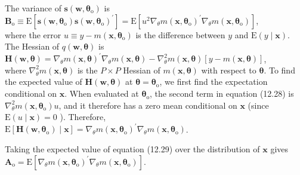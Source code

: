 \documentclass[10pt]{article}
\begin{document}
The variance of $\mathbf{s}\left(\mathbf{w}, \boldsymbol{\theta}_{\mathrm{o}}\right)$ is\\
$\mathbf{B}_{\mathrm{o}} \equiv \mathrm{E}\left[\mathbf{s}\left(\mathbf{w}, \boldsymbol{\theta}_{\mathrm{o}}\right) \mathbf{s}\left(\mathbf{w}, \boldsymbol{\theta}_{\mathrm{o}}\right)^{\prime}\right]=\mathrm{E}\left[u^{2} \nabla_{\theta} m\left(\mathbf{x}, \boldsymbol{\theta}_{\mathrm{o}}\right)^{\prime} \nabla_{\theta} m\left(\mathbf{x}, \boldsymbol{\theta}_{\mathrm{o}}\right)\right]$,\\
where the error $u \equiv y-m\left(\mathbf{x}, \boldsymbol{\theta}_{\mathrm{o}}\right)$ is the difference between $y$ and $\mathrm{E}(y \mid \mathbf{x})$.\\
The Hessian of $q(\mathbf{w}, \boldsymbol{\theta})$ is\\
$\mathbf{H}(\mathbf{w}, \boldsymbol{\theta})=\nabla_{\theta} m(\mathbf{x}, \boldsymbol{\theta})^{\prime} \nabla_{\theta} m(\mathbf{x}, \boldsymbol{\theta})-\nabla_{\theta}^{2} m(\mathbf{x}, \boldsymbol{\theta})[y-m(\mathbf{x}, \boldsymbol{\theta})]$,\\
where $\nabla_{\theta}^{2} m(\mathbf{x}, \boldsymbol{\theta})$ is the $P \times P$ Hessian of $m(\mathbf{x}, \boldsymbol{\theta})$ with respect to $\boldsymbol{\theta}$. To find the expected value of $\mathbf{H}(\mathbf{w}, \boldsymbol{\theta})$ at $\boldsymbol{\theta}=\boldsymbol{\theta}_{\mathrm{o}}$, we first find the expectation conditional on $\mathbf{x}$. When evaluated at $\boldsymbol{\theta}_{\mathrm{o}}$, the second term in equation (12.28) is $\nabla_{\theta}^{2} m\left(\mathbf{x}, \boldsymbol{\theta}_{\mathrm{o}}\right) u$, and it therefore has a zero mean conditional on $\mathbf{x}$ (since $\mathrm{E}(u \mid \mathbf{x})=0$ ). Therefore,\\
$\mathrm{E}\left[\mathbf{H}\left(\mathbf{w}, \boldsymbol{\theta}_{\mathrm{o}}\right) \mid \mathbf{x}\right]=\nabla_{\theta} m\left(\mathbf{x}, \boldsymbol{\theta}_{\mathrm{o}}\right)^{\prime} \nabla_{\theta} m\left(\mathbf{x}, \boldsymbol{\theta}_{\mathrm{o}}\right)$.

Taking the expected value of equation (12.29) over the distribution of $\mathbf{x}$ gives\\
$\mathbf{A}_{\mathrm{o}}=\mathrm{E}\left[\nabla_{\theta} m\left(\mathbf{x}, \boldsymbol{\theta}_{\mathrm{o}}\right)^{\prime} \nabla_{\theta} m\left(\mathbf{x}, \boldsymbol{\theta}_{\mathrm{o}}\right)\right]$.
\end{document}
